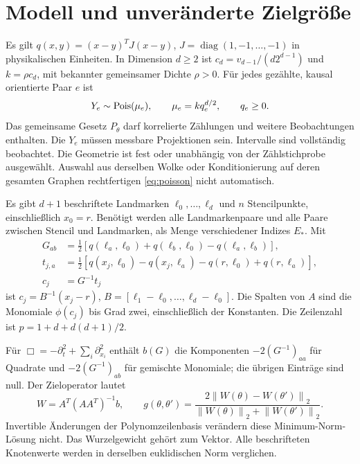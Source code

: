 \documentclass[11pt,a4paper]{article}
\newcommand{\norm}[1]{\left\lVert#1\right\rVert}\newcommand{\abs}[1]{\left|#1\right|}
\begin{document}
\section{Modell und unveränderte Zielgröße}
Es gilt $q(x,y)=(x-y)^TJ(x-y)$, $J=\operatorname{diag}(1,-1,\ldots,-1)$ in physikalischen Einheiten. In Dimension $d\geq2$ ist $c_d=v_{d-1}/(d2^{d-1})$ und $k=\rho c_d$, mit bekannter gemeinsamer Dichte $\rho>0$. Für jedes gezählte, kausal orientierte Paar $e$ ist
\begin{equation}\label{eq:poisson}
 Y_e\sim\operatorname{Pois}(\mu_e),\qquad \mu_e=kq_e^{d/2},\qquad q_e\geq0.
\end{equation}
Das gemeinsame Gesetz $P_\theta$ darf korrelierte Zählungen und weitere Beobachtungen enthalten. Die $Y_e$ müssen messbare Projektionen sein. Intervalle sind vollständig beobachtet. Die Geometrie ist fest oder unabhängig von der Zählstichprobe ausgewählt. Auswahl aus derselben Wolke oder Konditionierung auf deren gesamten Graphen rechtfertigen \eqref{eq:poisson} nicht automatisch.

Es gibt $d+1$ beschriftete Landmarken $\ell_0,\ldots,\ell_d$ und $n$ Stencilpunkte, einschließlich $x_0=r$. Benötigt werden alle Landmarkenpaare und alle Paare zwischen Stencil und Landmarken, als Menge verschiedener Indizes $E_*$. Mit
\begin{align}
 G_{ab}&=\tfrac12[q(\ell_a,\ell_0)+q(\ell_b,\ell_0)-q(\ell_a,\ell_b)],\\
 t_{j,a}&=\tfrac12[q(x_j,\ell_0)-q(x_j,\ell_a)-q(r,\ell_0)+q(r,\ell_a)],\\
 c_j&=G^{-1}t_j
\end{align}
ist $c_j=B^{-1}(x_j-r)$, $B=[\ell_1-\ell_0,\ldots,\ell_d-\ell_0]$. Die Spalten von $A$ sind die Monomiale $\phi(c_j)$ bis Grad zwei, einschließlich der Konstanten. Die Zeilenzahl ist $p=1+d+d(d+1)/2$.

Für $\Box=-\partial_t^2+\sum_i\partial_{x_i}^2$ enthält $b(G)$ die Komponenten $-2(G^{-1})_{aa}$ für Quadrate und $-2(G^{-1})_{ab}$ für gemischte Monomiale; die übrigen Einträge sind null. Der Zieloperator lautet
\begin{equation}
 W=A^T(AA^T)^{-1}b,\qquad
 g(\theta,\theta')=\frac{2\norm{W(\theta)-W(\theta')}_2}{\norm{W(\theta)}_2+\norm{W(\theta')}_2}.
\end{equation}
Invertible Änderungen der Polynomzeilenbasis verändern diese Minimum-Norm-Lösung nicht. Das Wurzelgewicht gehört zum Vektor. Alle beschrifteten Knotenwerte werden in derselben euklidischen Norm verglichen.
\end{document}

